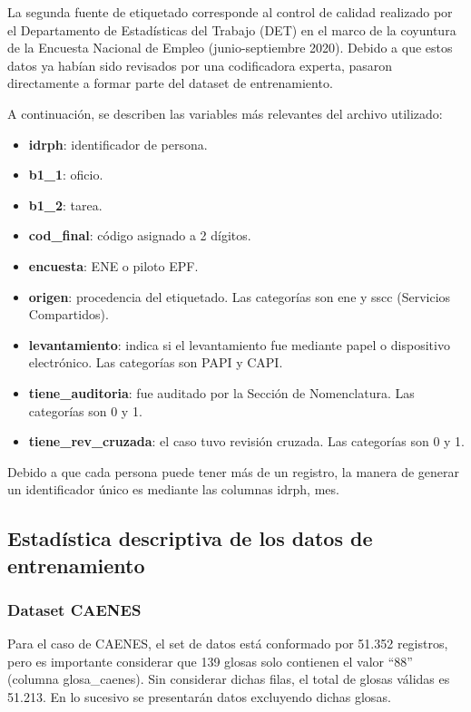 \documentclass[
  12pt,
  spanish,
]{article}
\providecommand{\tightlist}{%
  \setlength{\itemsep}{0pt}\setlength{\parskip}{0pt}}
\begin{document}
La segunda fuente de etiquetado corresponde al control de calidad
realizado por el Departamento de Estadísticas del Trabajo (DET) en el
marco de la coyuntura de la Encuesta Nacional de Empleo
(junio-septiembre 2020). Debido a que estos datos ya habían sido
revisados por una codificadora experta, pasaron directamente a formar
parte del dataset de entrenamiento.

A continuación, se describen las variables más relevantes del archivo
utilizado:

\begin{itemize}
\tightlist
\item
  \textbf{idrph}: identificador de persona.
\item
  \textbf{b1\_1}: oficio.
\item
  \textbf{b1\_2}: tarea.
\item
  \textbf{cod\_final}: código asignado a 2 dígitos.
\item
  \textbf{encuesta}: ENE o piloto EPF.
\item
  \textbf{origen}: procedencia del etiquetado. Las categorías son ene y
  sscc (Servicios Compartidos).
\item
  \textbf{levantamiento}: indica si el levantamiento fue mediante papel
  o dispositivo electrónico. Las categorías son PAPI y CAPI.
\item
  \textbf{tiene\_auditoria}: fue auditado por la Sección de
  Nomenclatura. Las categorías son 0 y 1.
\item
  \textbf{tiene\_rev\_cruzada}: el caso tuvo revisión cruzada. Las
  categorías son 0 y 1.
\end{itemize}

Debido a que cada persona puede tener más de un registro, la manera de
generar un identificador único es mediante las columnas idrph, mes.

\hypertarget{estaduxedstica-descriptiva-de-los-datos-de-entrenamiento}{%
\subsection{Estadística descriptiva de los datos de
entrenamiento}\label{estaduxedstica-descriptiva-de-los-datos-de-entrenamiento}}

\hypertarget{dataset-caenes-1}{%
\subsubsection{Dataset CAENES}\label{dataset-caenes-1}}

Para el caso de CAENES, el set de datos está conformado por 51.352
registros, pero es importante considerar que 139 glosas solo contienen
el valor ``88'' (columna glosa\_caenes). Sin considerar dichas filas, el
total de glosas válidas es 51.213. En lo sucesivo se presentarán datos
excluyendo dichas glosas.
\end{document}
